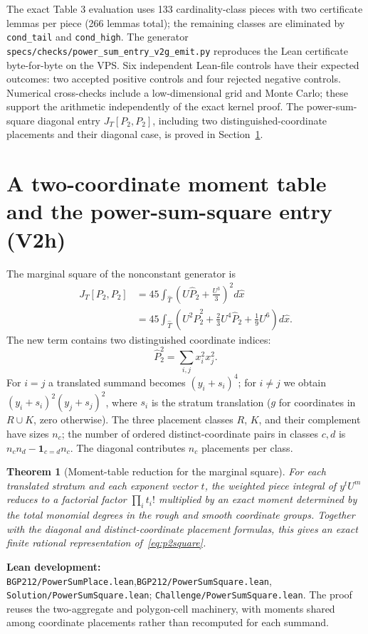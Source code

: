 \documentclass[11pt]{article}
\newtheorem{theorem}{Theorem}[section]
\newcommand{\code}[1]{\texttt{#1}}
\begin{document}
The exact Table 3 evaluation uses 133 cardinality-class pieces with two
certificate lemmas per piece (266 lemmas total); the remaining classes
are eliminated by \code{cond\_tail} and \code{cond\_high}.
The generator \code{specs/checks/power\_sum\_entry\_v2g\_emit.py}
reproduces the Lean certificate byte-for-byte on the VPS.
Six independent Lean-file controls have their expected outcomes: two
accepted positive controls and four rejected negative controls.
Numerical cross-checks include a low-dimensional grid and Monte Carlo;
these support the arithmetic independently of the exact kernel proof.
The power-sum-square diagonal entry $J_T[P_2,P_2]$, including two
distinguished-coordinate placements and their diagonal case, is proved in Section~\ref{sec:v2h}.

\section{A two-coordinate moment table and the power-sum-square entry (V2h)}\label{sec:v2h}
The marginal square of the nonconstant generator is
\begin{align}\label{eq:p2square}
 J_T[P_2,P_2]
 &=45\int_{\widehat T}\left(U\widehat P_2+\frac{U^3}{3}\right)^2d\widehat x\\
 &=45\int_{\widehat T}\left(U^2\widehat P_2^2
   +\frac23 U^4\widehat P_2+\frac19 U^6\right)d\widehat x.
\end{align}
The new term contains two distinguished coordinate indices:
\[
 \widehat P_2^2=\sum_{i,j}x_i^2x_j^2.
\]
For $i=j$ a translated summand becomes $(y_i+s_i)^4$; for $i\ne j$
we obtain $(y_i+s_i)^2(y_j+s_j)^2$, where $s_i$ is the stratum
translation ($g$ for coordinates in $R\cup K$, zero otherwise).
The three placement classes $R$, $K$, and their complement have sizes
$n_c$; the number of ordered distinct-coordinate pairs in classes
$c,d$ is $n_cn_d-\mathbf1_{c=d}n_c$. The diagonal contributes $n_c$
placements per class.

\begin{theorem}[Moment-table reduction for the marginal square]\label{thm:v2hmoment}
For each translated stratum and each exponent vector $t$, the
weighted piece integral of $y^t U^m$ reduces to a factorial factor
$\prod_i t_i!$ multiplied by an exact moment determined by the total
monomial degrees in the rough and smooth coordinate groups. Together
with the diagonal and distinct-coordinate placement formulas, this
gives an exact finite rational representation of~\eqref{eq:p2square}.
\end{theorem}
\noindent\textbf{Lean development:}
\nolinkurl{BGP212/PowerSumPlace.lean},\newline\nolinkurl{BGP212/PowerSumSquare.lean},
\nolinkurl{Solution/PowerSumSquare.lean};\newline
\nolinkurl{Challenge/PowerSumSquare.lean}.
The proof reuses the two-aggregate and polygon-cell machinery, with
moments shared among coordinate placements rather than recomputed for
each summand.
\end{document}
